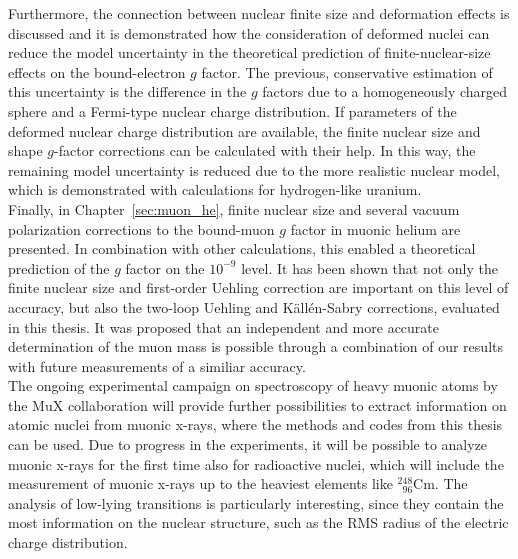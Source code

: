 Furthermore, the connection between nuclear finite size and deformation effects is discussed and it is demonstrated how the consideration of deformed nuclei can reduce the model uncertainty in the theoretical prediction of finite-nuclear-size effects on the bound-electron $g$ factor. The previous, conservative estimation of this uncertainty is the difference in the $g$ factors due to a homogeneously charged sphere and a Fermi-type nuclear charge distribution. If parameters of the deformed nuclear charge distribution are available, the finite nuclear size and shape $g$-factor corrections can be calculated with their help. In this way, the remaining model uncertainty is reduced due to the more realistic nuclear model, which is demonstrated with calculations for hydrogen-like uranium.\\[11pt]%
%
Finally, in Chapter~\ref{sec:muon_he}, finite nuclear size and several vacuum polarization corrections to the bound-muon $g$ factor in muonic helium are presented. In combination with other calculations, this enabled a theoretical prediction of the $g$ factor on the $10^{-9}$ level. It has been shown that not only the finite nuclear size and first-order Uehling correction are important on this level of accuracy, but also the two-loop Uehling and Källén-Sabry corrections, evaluated in this thesis. 
It was proposed that an independent and more accurate determination of the muon mass is possible through a combination of our results with future measurements of a similiar accuracy.\\[11pt]%
%
The ongoing experimental campaign on spectroscopy of heavy muonic atoms by the MuX collaboration will provide further possibilities to extract information on atomic nuclei from muonic x-rays, where the methods and codes from this thesis can be used. 
Due to progress in the experiments, it will be possible to analyze muonic x-rays for the first time also for radioactive nuclei, which will include the measurement of muonic x-rays up to the heaviest elements like $_{\phantom{1}96}^{248}$Cm. 
The analysis of low-lying transitions is particularly interesting, since they contain the most information on the nuclear structure, such as the RMS radius of the electric charge distribution.

